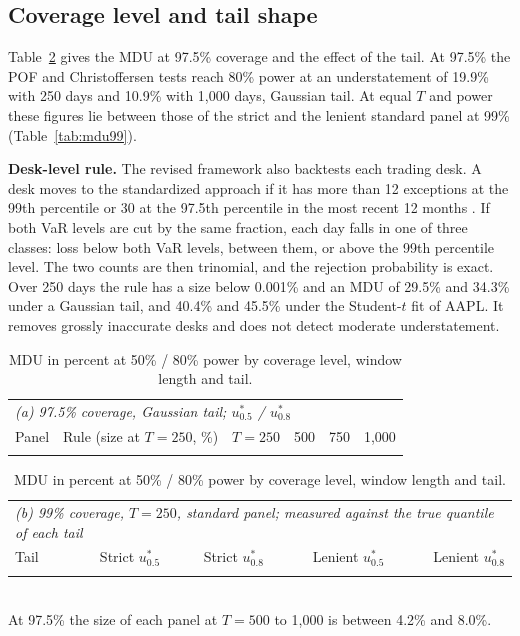 \documentclass[11pt]{article}
\begin{document}
\subsection{Coverage level and tail shape}

Table~\ref{tab:tails} gives the MDU at 97.5\% coverage and the effect of the
tail. At 97.5\% the POF and Christoffersen tests reach 80\% power at an
understatement of 19.9\% with 250 days and 10.9\% with 1,000 days, Gaussian
tail. At equal $T$ and power these figures lie between those of the strict and
the lenient standard panel at 99\% (Table~\ref{tab:mdu99}).

\textbf{Desk-level rule.} The revised framework also backtests each trading
desk. A desk moves to the standardized approach if it has more than 12
exceptions at the 99th percentile or 30 at the 97.5th percentile in the most
recent 12 months \citep[MAR32.19]{bcbsmar}. If both VaR levels are cut by the
same fraction, each day falls in one of three classes: loss below both VaR
levels, between them, or above the 99th percentile level. The two counts are
then trinomial, and the rejection probability is exact. Over 250 days the rule has a
size below 0.001\% and an MDU of 29.5\% and 34.3\% under a Gaussian
tail, and 40.4\% and 45.5\% under the Student-$t$ fit of AAPL. It removes
grossly inaccurate desks and does not detect moderate understatement.

\begin{table}[tbp]
\caption{MDU in percent at 50\% / 80\% power by coverage level, window length and tail.}
\label{tab:tails}
\small
\centering
\setlength{\tabcolsep}{4pt}
\begin{tabular}{llrrrr}
\toprule
\multicolumn{6}{l}{\textit{(a) 97.5\% coverage, Gaussian tail; $u^*_{0.5}$ / $u^*_{0.8}$}} \\
Panel & Rule (size at $T=250$, \%) & $T = 250$ & 500 & 750 & 1,000 \\
\midrule
\\
\bottomrule
\end{tabular}

\vspace{8pt}
\begin{tabular}{lrrrr}
\toprule
\multicolumn{5}{l}{\textit{(b) 99\% coverage, $T = 250$, standard panel; measured against the true quantile of each tail}} \\
Tail & Strict $u^*_{0.5}$ & Strict $u^*_{0.8}$ & Lenient $u^*_{0.5}$ & Lenient $u^*_{0.8}$ \\
\midrule
\\
\bottomrule
\end{tabular}
\\[2pt]
\footnotesize At 97.5\% the size of each panel at $T = 500$ to 1,000 is between 4.2\% and 8.0\%.
\end{table}
\end{document}
